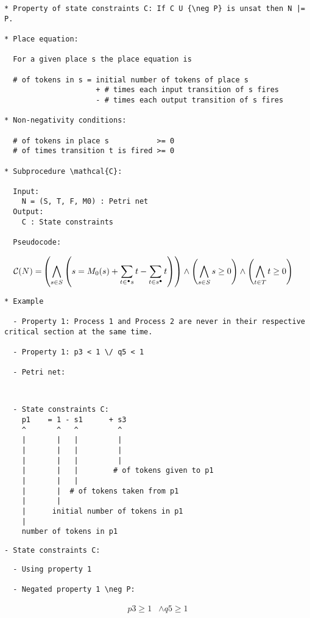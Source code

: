 \begin{verbatim}
* Property of state constraints C: If C U {\neg P} is unsat then N |= P.

* Place equation:
  
  For a given place s the place equation is

  # of tokens in s = initial number of tokens of place s
                     + # times each input transition of s fires
                     - # times each output transition of s fires

* Non-negativity conditions:

  # of tokens in place s           >= 0
  # of times transition t is fired >= 0

* Subprocedure \mathcal{C}:

  Input:
    N = (S, T, F, M0) : Petri net
  Output:
    C : State constraints

  Pseudocode:

\end{verbatim}

\begin{align*}
  \mathcal{C}(N) =& \left( \bigwedge_{s \in S} \left(
    s = M_0(s) + \sum_{t \in \prescript{\bullet}{}{s}} t - \sum_{t \in s^{\bullet}} t
  \right) \right) \land
    \left( \bigwedge_{s \in S} s \ge 0 \right) \land
    \left( \bigwedge_{t \in T} t \ge 0 \right)
\end{align*}

\newpage

\begin{verbatim}
* Example

  - Property 1: Process 1 and Process 2 are never in their respective critical section at the same time.

  - Property 1: p3 < 1 \/ q5 < 1

  - Petri net:

\end{verbatim}

% 

\newpage

\begin{verbatim}
  
\end{verbatim}

\begin{verbatim}
  - State constraints C:
    p1    = 1 - s1      + s3
    ^       ^   ^         ^
    |       |   |         |
    |       |   |         |
    |       |   |         |
    |       |   |        # of tokens given to p1
    |       |   |    
    |       |  # of tokens taken from p1
    |       |
    |      initial number of tokens in p1
    |
    number of tokens in p1
\end{verbatim}

\begin{verbatim}
- State constraints C:
\end{verbatim}



\begin{verbatim}
  - Using property 1
  
  - Negated property 1 \neg P:
\end{verbatim}

\begin{align*}
     p3 \ge 1 & \land q5 \ge 1
\end{align*}

\fi
